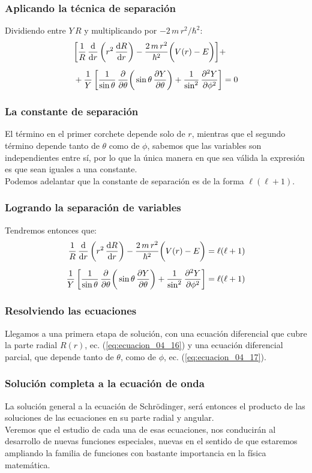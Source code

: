 \documentclass[12pt]{beamer}
\begin{document}
\begin{frame}
\frametitle{Aplicando la técnica de separación}
Dividiendo entre $Y \, R$ y multiplicando por $-2 \, m \, r^{2} / \hbar^{2}$:
\pause
\begin{align*}
&\bigg[ \dfrac{1}{R} \, \dv{r} \left( r^{2} \, \dv{R}{r} \right) - \dfrac{2 \, m \, r^{2}}{\hbar^{2}} \bigg( V(r) - E \bigg) \bigg] + \\[0.5em]
&+ \dfrac{1}{Y} \left[ \dfrac{1}{\sin \theta} \, \pdv{\theta} \bigg( \sin \theta \, \pdv{Y}{\theta} \bigg) + \dfrac{1}{\sin^{2}} \, \pdv[2]{Y}{\phi} \right] = 0
\end{align*}
\end{frame}
\begin{frame}
\frametitle{La constante de separación}
El término en el primer corchete depende solo de $r$, mientras que el segundo término depende tanto de $\theta$ como de $\phi$, sabemos que las variables son independientes entre sí, por lo que la única manera en que sea válida la expresión es que sean iguales a una constante.
\\
\bigskip
\pause
Podemos adelantar que la constante de separación es de la forma $\ell(\ell + 1)$.
\end{frame}
\begin{frame}
\frametitle{Logrando la separación de variables}
Tendremos entonces que:
\begin{align}
\dfrac{1}{R} \, \dv{r} \left( r^{2} \, \dv{R}{r} \right) - \dfrac{2 \, m \, r^{2}}{\hbar^{2}} \bigg( V(r) - E \bigg) &= \ell (\ell + 1) \label{eq:ecuacion_04_16} \\[0.5em]
\dfrac{1}{Y} \left[ \dfrac{1}{\sin \theta} \, \pdv{\theta} \bigg( \sin \theta \, \pdv{Y}{\theta} \bigg) + \dfrac{1}{\sin^{2}} \, \pdv[2]{Y}{\phi} \right] &= \ell (\ell + 1) \label{eq:ecuacion_04_17}    
\end{align}
\end{frame}
\begin{frame}
\frametitle{Resolviendo las ecuaciones}
Llegamos a una primera etapa de solución, con una ecuación diferencial que cubre la parte radial $R(r)$, ec. (\ref{eq:ecuacion_04_16}) y una ecuación diferencial parcial, que depende tanto de $\theta$, como de $\phi$, ec. (\ref{eq:ecuacion_04_17}).
\end{frame}
\begin{frame}
\frametitle{Solución completa a la ecuación de onda}
La solución general a la ecuación de Schrödinger, será entonces el producto de las soluciones de las ecuaciones en su parte radial y angular.
\\
\bigskip
\pause
Veremos que el estudio de cada una de esas ecuaciones, nos conducirán al desarrollo de nuevas funciones especiales, nuevas en el sentido de que estaremos ampliando la familia de funciones con bastante importancia en la física matemática.
\end{frame}
\end{document}
